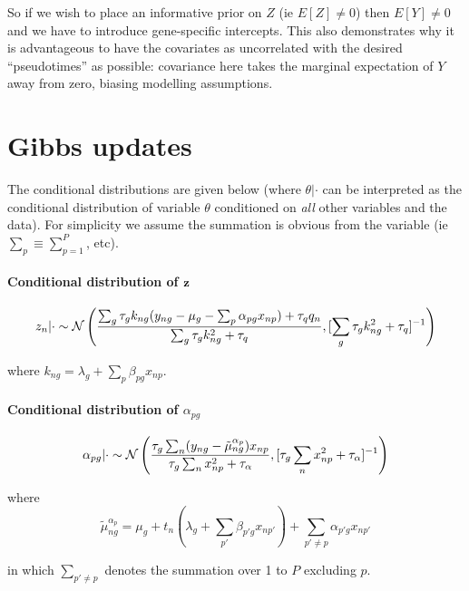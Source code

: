So if we wish to place an informative prior on $Z$ (ie $E[Z] \neq 0$) then $E[Y] \neq 0$ and we have to introduce gene-specific intercepts. This also demonstrates why it is advantageous to have the covariates as uncorrelated with the desired ``pseudotimes'' as possible: covariance here takes the marginal expectation of $Y$ away from zero, biasing modelling assumptions.


\section{Gibbs updates} \label{app:clvm_gibbs}


The conditional distributions are given below (where $\theta | \cdot$ can be interpreted as the conditional distribution of variable $\theta$ conditioned on \emph{all} other variables and the data). For simplicity we assume the summation is obvious from the variable (ie $\sum_p \equiv \sum_{p=1}^P$, etc).



\paragraph{Conditional distribution of ${\bf z}$}
\begin{equation}
z_n | \cdot \sim \mathcal{N} \left( \frac{ \sum_g \tau_g k_{ng} (y_{ng} - \mu_{g} - \sum_p \alpha_{pg}x_{np}) + \tau_q q_n}{\sum_g \tau_g k_{ng}^2 + \tau_q}, [\sum_g \tau_g k_{ng}^2 + \tau_q]^{-1} \right)
\end{equation}

where $k_{ng} = \lambda_g + \sum_p \beta_{pg} x_{np}$.

\paragraph{Conditional distribution of $\alpha_{pg}$}

\begin{equation}
\alpha_{pg} | \cdot \sim \mathcal{N} \left( \frac{
\tau_g \sum_n (y_{ng} - \tilde{\mu}_{ng}^{\alpha_p})x_{np}
}{\tau_g \sum_n x_{np}^2 + \tau_\alpha},
[\tau_g \sum_n x_{np}^2 + \tau_\alpha]^{-1} \right)
\end{equation}

where
\begin{equation}
\tilde{\mu}_{ng}^{\alpha_p} = \mu_g + t_n(\lambda_g + \sum_{p'} \beta_{p'g} x_{np'}) + \sum_{p' \neq p} \alpha_{p'g} x_{np'}
\end{equation}

in which $\sum_{p' \neq p}$ denotes the summation over 1 to $P$ excluding $p$.

